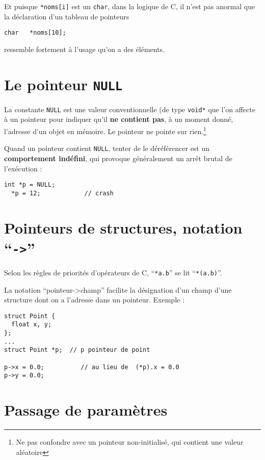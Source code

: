 Et puisque \texttt{*noms[i]} est un \texttt{char}, dans la logique de C, il n'est pas anormal que la déclaration d'un tableau de pointeurs

\begin{lstlisting}[style=cextract]
  char   *noms[10];
\end{lstlisting}

ressemble fortement à l'usage qu'on a des éléments.

\section{Le pointeur \texttt{NULL}}

La constante \texttt{NULL} est une valeur conventionnelle (de type
\texttt{void*} que l'on affecte à un pointeur pour indiquer qu'il
\textbf{ne contient pas}, à un moment donné, l'adresse d'un objet en
mémoire. Le pointeur ne pointe sur rien.\footnote{Ne pas confondre avec
  un pointeur non-initialisé, qui contient une valeur aléatoire}


Quand un pointeur contient \texttt{NULL},
tenter de le déréférencer est un \textbf{comportement indéfini},
qui provoque généralement un arrêt brutal de l'exécution :

\begin{lstlisting}[style=cextract]
  int *p = NULL;
  *p = 12;            // crash
\end{lstlisting}


\section{Pointeurs de structures, notation ``\texttt{->}''}

Selon les règles de priorités d'opérateurs de C,
``\texttt{*a.b}'' se lit  ``\texttt{*(a.b)}''.

La notation ``pointeur->champ'' facilite la désignation
d'un champ d'une structure dont on a l'adresse dans un
pointeur. Exemple :

\begin{lstlisting}[style=cextract]
struct Point {
  float x, y;
};
...
struct Point *p;  // p pointeur de point

p->x = 0.0;          // au lieu de  (*p).x = 0.0
p->y = 0.0;
\end{lstlisting}

\section{Passage de paramètres}

